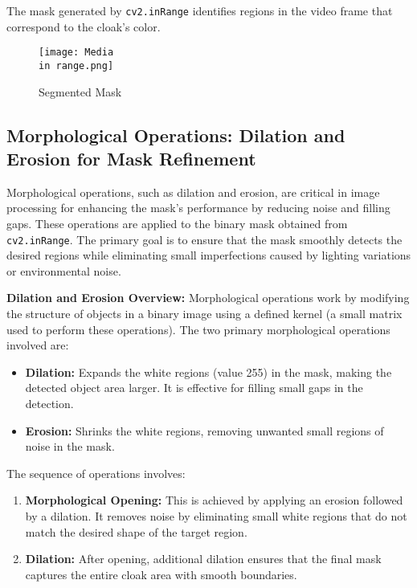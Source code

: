 \documentclass[onecolumn]{article} %
\begin{document}
The mask generated by \texttt{cv2.inRange} identifies regions in the video frame that correspond to the cloak's color. 

\begin{figure}[h!]
    \centering
    \texttt{[image: Media\\in range.png]}
    \caption{Segmented Mask}
    \label{fig:Mask}
\end{figure}

\subsection{Morphological Operations: Dilation and Erosion for Mask Refinement}

Morphological operations, such as dilation and erosion, are critical in image processing for enhancing the mask's performance by reducing noise and filling gaps. These operations are applied to the binary mask obtained from \texttt{cv2.inRange}. The primary goal is to ensure that the mask smoothly detects the desired regions while eliminating small imperfections caused by lighting variations or environmental noise.

\textbf{Dilation and Erosion Overview:}  
Morphological operations work by modifying the structure of objects in a binary image using a defined kernel (a small matrix used to perform these operations). The two primary morphological operations involved are:

\begin{itemize}
    \item \textbf{Dilation:} Expands the white regions (value 255) in the mask, making the detected object area larger. It is effective for filling small gaps in the detection.
    \item \textbf{Erosion:} Shrinks the white regions, removing unwanted small regions of noise in the mask.
\end{itemize}

The sequence of operations involves:
\begin{enumerate}
    \item \textbf{Morphological Opening:} This is achieved by applying an erosion followed by a dilation. It removes noise by eliminating small white regions that do not match the desired shape of the target region.
    \item \textbf{Dilation:} After opening, additional dilation ensures that the final mask captures the entire cloak area with smooth boundaries.
\end{enumerate}
\end{document}
